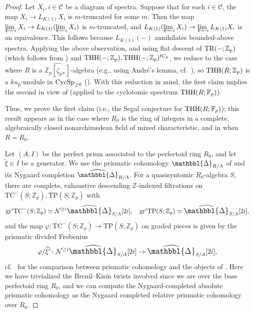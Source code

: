 \documentclass{amsart}
\newcommand{\Prism}{{\mathlarger{\mathbbl{\Delta}}}}
\newcommand{\Prismh}{\widehat{\Prism}}
\newcommand{\gr}{\mathrm{gr}}
\theoremstyle{definition}
\newcommand{\TC}{\mathrm{TC}}
\newcommand{\TP}{\mathrm{TP}}
\begin{document}
\begin{proof} 
Let $X_i, i \in \mathcal{C}$ be a diagram of spectra. 
Suppose that for each $i \in \mathcal{C}$, the map $X_i \to L_{K(1)} X_i$ is
$m$-truncated for some $m$. Then the map $\varprojlim_i X_i \to L_{K(1)} ( \varprojlim_i
X_i)$ is $m$-truncated, and $L_{K(1)} ( \varprojlim_i X_i) \to \varprojlim_i
L_{K(1)} X_i$ is an equivalence. This follows because $L_{K(1)}(-)$ annihilates
bounded-above spectra. 
Applying the above observation, 
and using flat descent of $\mathrm{TR}(-; \mathbb{Z}_p)$ (which follows from
\cite[Sec.~3]{BMS2}) and $\mathrm{THH}(-; \mathbb{Z}_p), \mathrm{THH}(-; \mathbb{Z}_p)^{tC_p}$,
we 
reduce to the case where $R$ is a $\widehat{\mathbb{Z}_p[\zeta_{p^\infty}]}$-algebra (e.g., using Andr\'e's lemma,
cf.~\cite[Th.~7.12]{Prisms}), so 
$\mathrm{THH}(R; \mathbb{Z}_p)$ is a $ku_{\hat{p}}  $-module in
$\mathrm{CycSp}_{\geq 0}$ (). 
With this reduction in mind, the first claim implies the second 
in view of  (applied to the cyclotomic spectrum $\mathrm{THH}(R;
\mathbb{F}_p)$). 

Thus, we prove the first claim (i.e., the Segal conjecture for $\mathrm{THH}(R;
\mathbb{F}_p)$); this result appears as \cite[Cor.~9.12]{BMS2} in
the case where $R_0  $ is the ring of integers in a complete, algebraically
closed nonarchimedean field of mixed characteristic, and in \cite[Sec.~6]{BMS2}
when $R  = R_0$. 

Let $(A, I)$ be the perfect prism associated to 
the perfectoid ring $R_0$, and let $\widetilde{\xi} \in I$ be a generator. 
We use the prismatic cohomology $\Prism_{R/A}$ of \cite{Prisms} and its Nygaard completion $\Prismh_{R/A}$. 
For a quasisyntomic $R_0$-algebra $S$, 
there are \cite{BMS2} complete, exhaustive descending $\mathbb{Z}$-indexed
filtrations on $\TC^-(S; \mathbb{Z}_p), \TP(S; \mathbb{Z}_p)$
with 
$$\gr^i \TC^-( S; \mathbb{Z}_p) \simeq \mathcal{N}^{\geq i} \Prismh_{S/A}[2i], 
\quad \gr^i \TP(S; \mathbb{Z}_p) \simeq \Prismh_{S/A}[2i],
$$ 
and the map $\varphi \colon \TC^-(S; \mathbb{Z}_p) \to \TP(S;
\mathbb{Z}_p)$ 
on graded pieces is given by 
the prismatic divided Frobenius \begin{equation} \label{varphigr}
\varphi/\widetilde{\xi}^i
\colon \mathcal{N}^{\geq i} \Prismh_{S/A}[2i] \to
\Prismh_{S/A}[2i],  \end{equation}
cf.~\cite[Sec.~13]{Prisms} for the comparison between prismatic cohomology and
the objects of \cite{BMS2}. 
Here we have trivialized the Breuil--Kisin twists involved since we are over the
base perfectoid ring $R_0$, and we can compute the Nygaard-completed absolute
prismatic cohomology as the Nygaard completed relative prismatic cohomology
over $R_0$. 



\end{proof}
\end{document}
